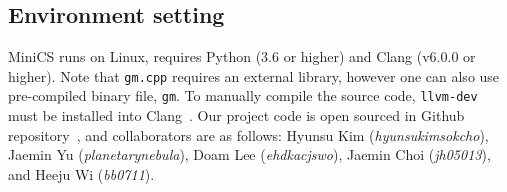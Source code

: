 \subsection{Environment setting}

MiniCS runs on Linux, requires Python (3.6 or higher) and Clang (v6.0.0 or higher). Note that \verb|gm.cpp| requires an external library, however one can also use pre-compiled binary file, \verb|gm|. To manually compile the source code, \verb|llvm-dev| must be installed into Clang~\cite{clang}. Our project code is open sourced in Github repository~\cite{miniCS}, and collaborators are as follows: Hyunsu Kim (\textit{hyunsukimsokcho}), Jaemin Yu (\textit{planetarynebula}), Doam Lee (\textit{ehdkacjswo}), Jaemin Choi (\textit{jh05013}), and Heeju Wi (\textit{bb0711}).
